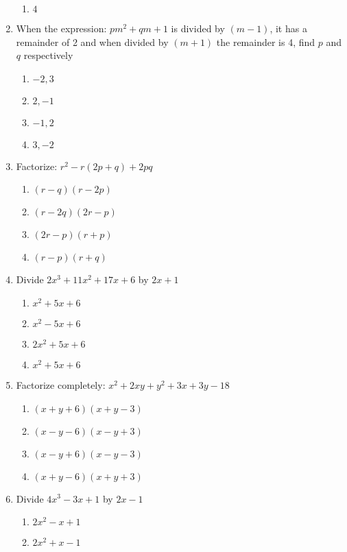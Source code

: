 \begin{multicols}{2}
\begin{enumerate}[label={\arabic*.}]
\begin{enumerate}[label={\Alph*.}]
        \item \(4\)
      \end{enumerate}
    \item When the expression: $pm^2 + qm + 1$ is divided by $(m-1)$, it has a remainder of 2 and when divided by $(m+1)$ the remainder is 4, find $p$ and $q$ respectively
      \begin{enumerate}[label={\Alph*.}]
        \item \(-2,3\)
        \item \(2,-1\)
        \item \(-1,2\)
        \item \(3,-2\)
      \end{enumerate}
    \item Factorize: $r^2 - r(2p + q) + 2pq $
      \begin{enumerate}[label={\Alph*.}]
        \item \((r-q)(r-2p)\)
        \item \((r-2q)(2r-p)\)
        \item \((2r - p)(r+p)\)
        \item \((r-p)(r+q)\)
      \end{enumerate}
    \item Divide $2x^3 + 11x^2 +  17x + 6$ by $2x +1$
      \begin{enumerate}[label={\Alph*.}]
        \item \(x^2 + 5x + 6\)
        \item \(x^2 - 5x + 6\)
        \item \(2x^2 + 5x + 6\)
        \item \(x^2 + 5x + 6\)
      \end{enumerate}
    \item Factorize completely: $x^2 + 2xy + y^2 + 3x + 3y -18$
      \begin{enumerate}[label={\Alph*.}]
        \item \((x+y+6)(x+y-3)\)
        \item \((x-y-6)(x-y+3)\)
        \item \((x-y+6)(x-y-3)\)
        \item \((x+y-6)(x+y+3)\)
      \end{enumerate}
    \item Divide $4x^3 - 3x + 1$ by $2x -1$
      \begin{enumerate}[label={\Alph*.}]
        \item \(2x^2 -x + 1\)
        \item \(2x^2 + x -1\)

\end{enumerate}
\end{enumerate}
\end{multicols}
